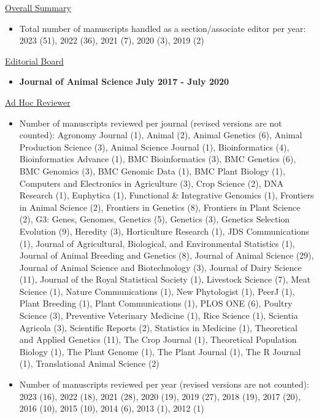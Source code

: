\documentclass[margin,line,10pt]{res}
\begin{document}
\begin{resume}
\underline{Overall Summary}
 \vspace{.2cm}
\begin{itemize}
\item Total number of manuscripts handled as a section/associate editor per year: 2023 (51), 2022 (36), 2021 (7), 2020 (3), 2019 (2) 
\end{itemize}


\vspace{0.3cm}


\underline{Editorial Board}
 \vspace{.2cm}
\begin{itemize}
\item {\bf Journal of Animal Science} \hfill  {\bf July 2017 - July 2020} 
\end{itemize}





\vspace{0.3cm}
\underline{Ad Hoc Reviewer}
\begin{itemize}
    \vspace{.1cm}
\item  Number of manuscripts reviewed per journal (revised versions are not counted): Agronomy Journal (1), Animal (2), Animal Genetics (6), Animal Production Science (3), Animal Science Journal (1), Bioinformatics (4), Bioinformatics Advance (1), BMC Bioinformatics (3), BMC Genetics (6), BMC Genomics (3), BMC Genomic Data (1), BMC Plant Biology (1), Computers and Electronics in Agriculture (3), Crop Science (2), DNA Research (1),  Euphytica (1), Functional \& Integrative Genomics (1), Frontiers in Animal Science (2), Frontiers in Genetics (8), Frontiers in Plant Science (2), G3: Genes, Genomes, Genetics (5), Genetics (3), Genetics Selection Evolution (9), Heredity (3), Horticulture Research (1), JDS Communications (1), Journal of Agricultural, Biological, and Environmental Statistics (1), Journal of Animal Breeding and Genetics (8), Journal of Animal Science (29), Journal of Animal Science and Biotechnology (3), Journal of Dairy Science (11), Journal of the Royal Statistical Society (1), Livestock Science (7), Meat Science (1), Nature Communications (1), New Phytologist (1), PeerJ (1), Plant Breeding (1), Plant Communications (1), PLOS ONE (6), Poultry Science (3), Preventive Veterinary Medicine (1), Rice Science (1), Scientia Agricola (3), Scientific Reports (2), Statistics in Medicine (1), Theoretical and Applied Genetics (11), The Crop Journal (1), Theoretical Population Biology (1), The Plant Genome (1), The Plant Journal (1), The R Journal (1), Translational Animal Science (2)  
  \vspace{.1cm}
  \item Number of manuscripts reviewed per year (revised versions are not counted): 2023 (16), 2022 (18), 2021 (28), 2020 (19), 2019 (27), 2018 (19), 2017 (20), 2016 (10), 2015 (10), 2014 (6), 2013 (1), 2012 (1)
\end{itemize}




\end{resume}
\end{document}
